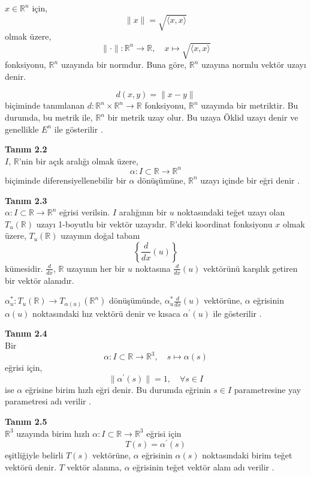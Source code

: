 \documentclass[a4paper,12pt]{article}
\begin{document}
$x \in \mathbb{R}^n$ için,
\[
\|x\| = \sqrt{\langle x, x \rangle}
\]
olmak üzere,
\[
\|\cdot\| : \mathbb{R}^n \to \mathbb{R}, \quad x \mapsto \sqrt{\langle x, x \rangle}
\]
fonksiyonu, $\mathbb{R}^n$ uzayında bir normdur. Buna göre, $\mathbb{R}^n$ uzayına normlu vektör uzayı denir.

\[
d(x, y) = \|x - y\|
\]
biçiminde tanımlanan $d : \mathbb{R}^n \times \mathbb{R}^n \to \mathbb{R}$ fonksiyonu, $\mathbb{R}^n$ uzayında bir metriktir. Bu durumda, bu metrik ile, $\mathbb{R}^n$ bir metrik uzay olur. Bu uzaya Öklid uzayı denir ve genellikle $E^n$ ile gösterilir \cite{ref}.

\textbf{Tanım 2.2} \\
$I$, $\mathbb{R}$'nin bir açık aralığı olmak üzere,
\[
\alpha : I \subset \mathbb{R} \to \mathbb{R}^n
\]
biçiminde diferensiyellenebilir bir $\alpha$ dönüşümüne, $\mathbb{R}^n$ uzayı içinde bir eğri denir \cite{ref}.

\textbf{Tanım 2.3} \\ 
$\alpha : I \subset \mathbb{R} \to \mathbb{R}^n$ eğrisi verilsin. $I$ aralığının bir $u$ noktasındaki teğet uzayı olan $T_u(\mathbb{R})$ uzayı 1-boyutlu bir vektör uzayıdır. $\mathbb{R}$'deki koordinat fonksiyonu $x$ olmak üzere, $T_u(\mathbb{R})$ uzayının doğal tabanı
\[
\left\{ \frac{d}{dx}(u) \right\}
\]
kümesidir. $\frac{d}{dx}$, $\mathbb{R}$ uzayının her bir $u$ noktasına $\frac{d}{dx}(u)$ vektörünü karşılık getiren bir vektör alanıdır.

$\alpha^\ast_u : T_u(\mathbb{R}) \to T_{\alpha(u)} (\mathbb{R}^n)$ dönüşümünde, $\alpha^\ast_u \frac{d}{dx}(u)$ vektörüne, $\alpha$ eğrisinin $\alpha(u)$ noktasındaki hız vektörü denir ve kısaca $\alpha^\prime(u)$ ile gösterilir \cite{ref}.

\textbf{Tanım 2.4} \\ 
Bir 
\[
\alpha: I \subset \mathbb{R} \to \mathbb{R}^3, \quad s \mapsto \alpha(s)
\]
eğrisi için,
\[
\|\alpha^\prime(s) \| = 1, \quad \forall s \in I
\]
ise $\alpha$ eğrisine birim hızlı eğri denir. Bu durumda eğrinin $s \in I$ parametresine yay parametresi adı verilir \cite{ref1, ref2}.

\textbf{Tanım 2.5} \\ 
$\mathbb{R}^3$ uzayında birim hızlı $\alpha: I \subset \mathbb{R} \to \mathbb{R}^3$ eğrisi için
\[
T(s) = \alpha^\prime(s)
\]
eşitliğiyle belirli $T(s)$ vektörüne, $\alpha$ eğrisinin $\alpha(s)$ noktasındaki birim teğet vektörü denir. $T$ vektör alanına, $\alpha$ eğrisinin teğet vektör alanı adı verilir \cite{ref}.
\end{document}
